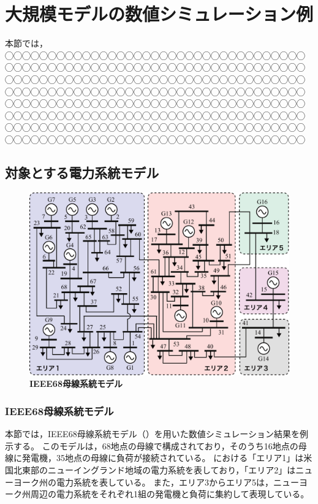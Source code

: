 \documentclass[tombow,dvipdfmx]{corona-a5-1.1}
\begin{document}
\chapter{大規模モデルの数値シミュレーション例}\label{chap:largesim}

本節では，
◯◯◯◯◯◯◯◯◯◯◯◯◯◯◯◯◯◯◯◯◯◯◯◯◯◯◯◯◯◯◯◯◯◯◯
◯◯◯◯◯◯◯◯◯◯◯◯◯◯◯◯◯◯◯◯◯◯◯◯◯◯◯◯◯◯◯◯◯◯◯
◯◯◯◯◯◯◯◯◯◯◯◯◯◯◯◯◯◯◯◯◯◯◯◯◯◯◯◯◯◯◯◯◯◯◯
◯◯◯◯◯◯◯◯◯◯◯◯◯◯◯◯◯◯◯◯◯◯◯◯◯◯◯◯◯◯◯◯◯◯◯
◯◯◯◯◯◯◯◯◯◯◯◯◯◯◯◯◯◯◯◯◯◯◯◯◯◯◯◯◯◯◯◯◯◯◯
◯◯◯◯◯◯◯◯◯◯◯◯◯◯◯◯◯◯◯◯◯◯◯◯◯◯◯◯◯◯◯◯◯◯◯
◯◯◯◯◯◯◯◯◯◯◯◯◯◯◯◯◯◯◯◯◯◯◯◯◯◯◯◯◯◯◯◯◯◯◯
◯◯◯◯◯◯◯◯◯◯◯◯◯◯◯◯◯◯◯◯◯◯◯◯◯◯◯◯◯◯◯◯◯◯◯


\section{対象とする電力系統モデル}

\begin{figure}[t]
\centering
\includegraphics[width = .99\linewidth]{figs/IEEE68bus}
\medskip
\caption{\textbf{IEEE68母線系統モデル}}
\label{fig:IEEE68bus}
\medskip
\end{figure}

\subsection{IEEE68母線系統モデル}

本節では，IEEE68母線系統モデル（）を用いた数値シミュレーション結果を例示する。
このモデルは，68地点の母線で構成されており，そのうち16地点の母線に発電機，35地点の母線に負荷が接続されている。
における「エリア1」は米国北東部のニューイングランド地域の電力系統を表しており，「エリア2」はニューヨーク州の電力系統を表している。
また，エリア3からエリア5は，ニューヨーク州周辺の電力系統をそれぞれ1組の発電機と負荷に集約して表現している。
\end{document}
